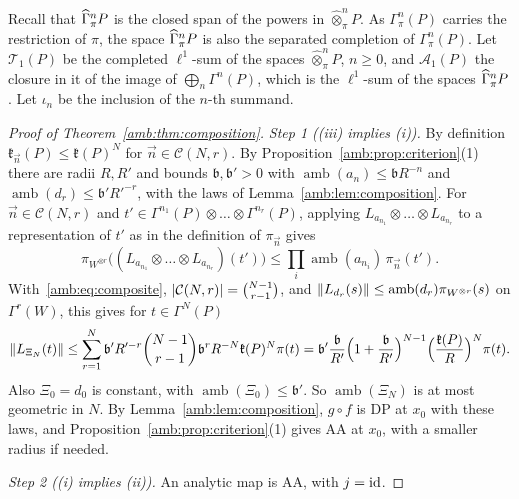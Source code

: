 Recall that $\widehat\Gamma^n_\pi P$ is the closed span of the powers in $\widehat\otimes^n_\pi P$. As $\Gamma^n_\pi(P)$ carries the restriction of $\pi$, the space $\widehat\Gamma^n_\pi P$ is also the separated completion of $\Gamma^n_\pi(P)$. Let $\mathcal T_1(P)$ be the completed $\ell^1$-sum of the spaces $\widehat\otimes^n_\pi P$, $n\ge0$, and $\mathcal A_1(P)$ the closure in it of the image of $\bigoplus_n\Gamma^n(P)$, which is the $\ell^1$-sum of the spaces $\widehat\Gamma^n_\pi P$. Let $\iota_n$ be the inclusion of the $n$-th summand.

\begin{proof}[Proof of Theorem~\ref{amb:thm:composition}]
\emph{Step 1 ((iii) implies (i)).} By definition $\mathfrak k_{\vec n}(P)\le\mathfrak k(P)^N$ for $\vec n\in\mathcal C(N,r)$. By Proposition~\ref{amb:prop:criterion}(1) there are radii $R,R'$ and bounds $\mathfrak b,\mathfrak b'>0$ with $\operatorname{amb}(a_n)\le \mathfrak bR^{-n}$ and $\operatorname{amb}(d_r)\le \mathfrak b'R'^{-r}$, with the laws of Lemma~\ref{amb:lem:composition}. For $\vec n\in\mathcal C(N,r)$ and $t'\in\Gamma^{n_1}(P)\otimes\dots\otimes\Gamma^{n_r}(P)$, applying $L_{a_{n_1}}\otimes\dots\otimes L_{a_{n_r}}$ to a representation of $t'$ as in the definition of $\pi_{\vec n}$ gives
\begin{equation}\label{amb:b:eq:tensor-bound}
 \pi_{W^{\otimes r}}\bigl((L_{a_{n_1}}\otimes\dots\otimes L_{a_{n_r}})(t')\bigr)\le\prod_i\operatorname{amb}(a_{n_i})\,\pi_{\vec n}(t').
\end{equation}
With~\eqref{amb:eq:composite}, $\lvert \mathcal C(N,r)\rvert=\binom{N-1}{r-1}$, and $\lVert L_{d_r}(s)\rVert\le\operatorname{amb}(d_r)\pi_{W^{\otimes r}}(s)$ on $\Gamma^r(W)$, this gives for $t\in\Gamma^N(P)$
\[
 \lVert L_{\Xi_N}(t)\rVert\le\sum_{r=1}^N\mathfrak b'R'^{-r}\binom{N-1}{r-1}\mathfrak b^rR^{-N}\mathfrak k(P)^N\pi(t)
 =\mathfrak b'\frac{\mathfrak b}{R'}\Bigl(1+\frac{\mathfrak b}{R'}\Bigr)^{N-1}\Bigl(\frac{\mathfrak k(P)}R\Bigr)^N\pi(t).
\]
Also $\Xi_0=d_0$ is constant, with $\operatorname{amb}(\Xi_0)\le \mathfrak b'$. So $\operatorname{amb}(\Xi_N)$ is at most geometric in $N$. By Lemma~\ref{amb:lem:composition}, $g\circ f$ is DP at $x_0$ with these laws, and Proposition~\ref{amb:prop:criterion}(1) gives AA at $x_0$, with a smaller radius if needed.

\emph{Step 2 ((i) implies (ii)).} An analytic map is AA, with $j=\mathrm{id}$.


\end{proof}
